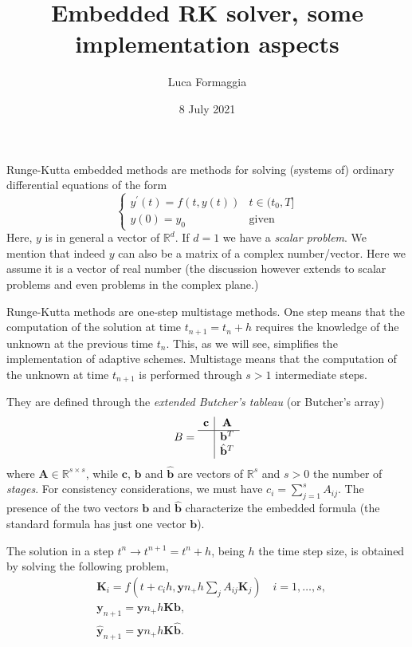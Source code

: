 \documentclass[10pt,a4paper,twoside]{article}
\title{Embedded RK solver, some implementation aspects}
\author{Luca Formaggia}
\date{8 July 2021}
\begin{document}
    \maketitle
    
    Runge-Kutta embedded methods are methods for solving (systems of) ordinary differential equations of the form
    \[
    \begin{cases}
    y^\prime(t)=f(t,y(t)) & t\in (t_0,T]\\
    y(0)=y_0 & \text{given}
    \end{cases}
    \]
Here, $y$ is in general a vector of $\mathbb{R}^d$. If $d=1$ we have a \emph{scalar problem}.
We mention that indeed $y$ can also be a matrix of a complex number/vector. 
Here we assume it is a vector of real number (the discussion however extends to scalar problems and 
even problems in the complex plane.)


Runge-Kutta methods are one-step multistage methods. 
One step means that the computation of the solution at time $t_{n+1}=t_n+h$ requires the knowledge of the unknown at the previous time $t_n$.
This, as we will see, simplifies the implementation of adaptive schemes.
Multistage means that the computation of the unknown at time $t_{n+1}$ is performed through $s>1$ intermediate steps. 


They are defined through the \emph{extended Butcher's tableau} (or Butcher's array)
\[
B=\begin{array}{c|c}
\mathbf{c}& \mathbf{A}\\
\hline
& \mathbf{b}^T\\
& \hat{\mathbf{b}}^T
\end{array}
\]
where $\mathbf{A}\in\mathbb{R}^{s\times s}$, while $\mathbf{c}$, $\mathbf{b}$ and $\hat{\mathbf{b}}$ are vectors of $\mathbb{R}^s$ and $s>0$ the number of \emph{stages}.
For consistency considerations, we must have $c_i=\sum_{j=1}^s A_{ij}$.
The presence of the two vectors $\mathbf{b}$ and $\hat{\mathbf{b}}$ characterize the embedded formula (the standard formula has just one vector $\mathbf{b}$).


The solution in a step $t^n\to t^{n+1}=t^n+h$, being $h$ the time step size, is obtained by solving the following problem,
\begin{align}\label{eq:rk1}
&\mathbf{K}_i = f(t+c_ih,\mathbf{y}n_+h\sum_j A_{ij}\mathbf{K}_j)\quad i=1,\ldots,s,\\
\label{eq:rkt}
&\mathbf{y}_{n+1}=\mathbf{y}n_ + h \mathbf{K}\mathbf{b},\\\label{eq:rk3}
&\hat{\mathbf{y}}_{n+1}=\mathbf{y}n_ + h \mathbf{K}\hat{\mathbf{b}}.
\end{align}
\end{document}
